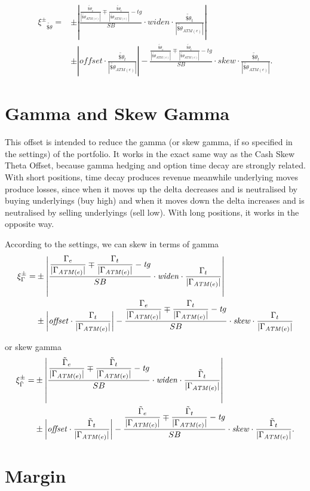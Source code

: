 \documentclass[10pt, a4paper, oneside]{article}
\def\ds{\displaystyle}
\newcommand{\atm}{\ensuremath{\mathit{ATM}}}
\newcommand{\sgamma}{\ensuremath{\tilde{\Gamma}}}
\newcommand{\cstheta}{\ensuremath{\widetilde{\cash\theta}}}
\newcommand{\cash}{\ensuremath{\mathdollar}}
\newcommand{\offsetbs}{\ensuremath{\xi^{\pm}}}
\newcommand{\target}{\ensuremath{\mathit{tg}}}
\newcommand{\widen}{\ensuremath{\mathit{widen}}}
\newcommand{\skw}{\ensuremath{\mathit{skew}}}
\newcommand{\offset}{\ensuremath{\mathit{offset}}}
\newcommand{\skewunits}[3]{\ensuremath{\frac{{#1}\mp{#2}-\target}{{#3}}}}
\begin{document}
\newcommand{\amountatmthetas}[1]{\ensuremath{\ds\frac{#1}{|\cstheta_{\atm(e)}|}}}
\newcommand{\thetaoffsetformula}[4]{{\begin{align*}\offsetbs_{#4}=&\pm\left|\skewunits{#1}{#2}{#3}\cdot\widen\cdot{#2}\right| \\&\pm \left|\offset\cdot{#2}\right| - \skewunits{#1}{#2}{#3}\cdot\skw\cdot{#2}.\end{align*}}}
\thetaoffsetformula{\amountatmthetas{\cstheta_e}}{\amountatmthetas{\cstheta_t}}{SB}{\cstheta}









\section{Gamma and Skew Gamma}
\noindent This offset is intended to reduce the gamma (or skew gamma, if so specified in the settings) of the portfolio. It works in the exact same way as the Cash Skew Theta Offset, because gamma hedging and option time decay are strongly related. With short positions,
time decay produces revenue meanwhile underlying moves produce losses, since when it moves up the delta decreases and is neutralised by buying underlyings (buy high) and when it moves down the delta increases and is neutralised by selling underlyings (sell low). With
long positions, it works in the opposite way.

\noindent According to the settings, we can skew in terms of gamma
\newcommand{\amountatmgammas}[1]{\ensuremath{\ds\frac{#1}{|\Gamma_{\atm(e)}|}}}
\newcommand{\gammaoffsetformula}[4]{\ensuremath{\offsetbs_{#4}=&\pm\left|\skewunits{#1}{#2}{#3}\cdot\widen\cdot{#2}\right| \\&\pm \left|\offset\cdot{#2}\right| - \skewunits{#1}{#2}{#3}\cdot\skw\cdot{#2}}}
\begin{align*}\gammaoffsetformula{\amountatmgammas{\Gamma_e}}{\amountatmgammas{\Gamma_t}}{SB}{\Gamma}\end{align*}

\noindent or skew gamma
\begin{align*}\gammaoffsetformula{\amountatmgammas{\sgamma_e}}{\amountatmgammas{\sgamma_t}}{SB}{\sgamma}.\end{align*}








\section{Margin}
\end{document}
